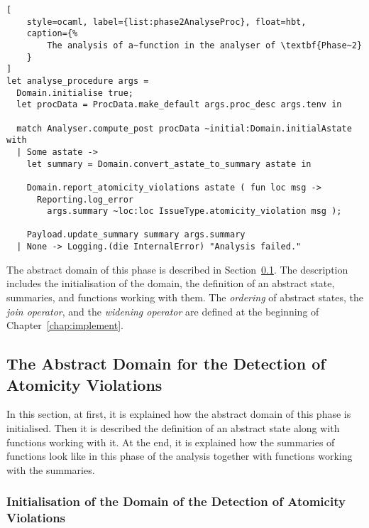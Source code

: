 \begin{lstlisting}[
    style=ocaml, label={list:phase2AnalyseProc}, float=hbt,
    caption={%
        The analysis of a~function in the analyser of \textbf{Phase~2}
    }
]
let analyse_procedure args =
  Domain.initialise true;
  let procData = ProcData.make_default args.proc_desc args.tenv in

  match Analyser.compute_post procData ~initial:Domain.initialAstate with
  | Some astate ->
    let summary = Domain.convert_astate_to_summary astate in

    Domain.report_atomicity_violations astate ( fun loc msg ->
      Reporting.log_error
        args.summary ~loc:loc IssueType.atomicity_violation msg );

    Payload.update_summary summary args.summary
  | None -> Logging.(die InternalError) "Analysis failed."
\end{lstlisting}

The abstract domain of this phase is described in
Section~\ref{sec:implementPhase2Domain}. The description includes the
initialisation of the domain, the definition of an abstract state,
summaries, and functions working with them. The \emph{ordering} of abstract
states, the \emph{join operator}, and the \emph{widening operator} are
defined at the beginning of Chapter~\ref{chap:implement}.


\subsection{The Abstract Domain for the Detection of Atomicity Violations}
\label{sec:implementPhase2Domain}

In this section, at first, it is explained how the abstract domain of this
phase is initialised. Then it is described the definition of an abstract
state along with functions working with it. At the end, it is explained how
the summaries of functions look like in this phase of the analysis together
with functions working with the summaries.

\subsubsection{%
    Initialisation of the Domain of the Detection of Atomicity Violations
}

